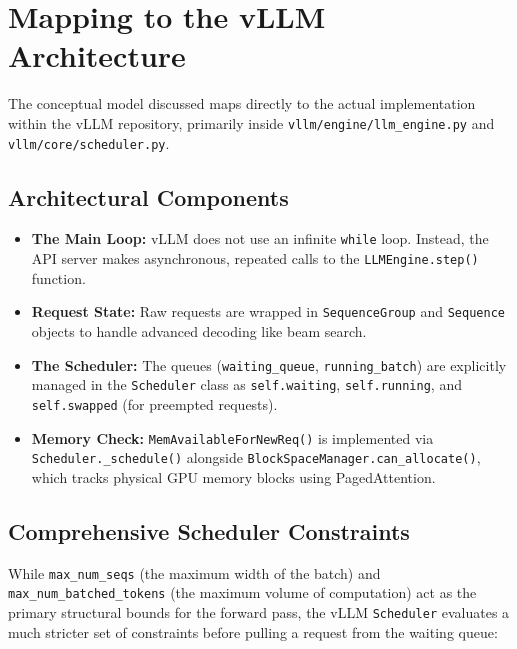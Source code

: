 \documentclass[11pt]{article}
\begin{document}
\section{Mapping to the vLLM Architecture}
\label{sec:vllm_mapping}

The conceptual model discussed maps directly to the actual implementation within the vLLM repository, primarily inside \texttt{vllm/engine/llm\_engine.py} and \texttt{vllm/core/scheduler.py}.

\subsection{Architectural Components}
\label{subsec:vllm_architecture}

\begin{itemize}
    \item \textbf{The Main Loop:} vLLM does not use an infinite \texttt{while} loop. Instead, the API server makes asynchronous, repeated calls to the \texttt{LLMEngine.step()} function.
    \item \textbf{Request State:} Raw requests are wrapped in \texttt{SequenceGroup} and \texttt{Sequence} objects to handle advanced decoding like beam search.
    \item \textbf{The Scheduler:} The queues (\texttt{waiting\_queue}, \texttt{running\_batch}) are explicitly managed in the \texttt{Scheduler} class as \texttt{self.waiting}, \texttt{self.running}, and \texttt{self.swapped} (for preempted requests).
    \item \textbf{Memory Check:} \texttt{MemAvailableForNewReq()} is implemented via \texttt{Scheduler.\_schedule()} alongside \texttt{BlockSpaceManager.can\_allocate()}, which tracks physical GPU memory blocks using PagedAttention.
\end{itemize}

\subsection{Comprehensive Scheduler Constraints}
\label{subsec:vllm_constraints}

While \texttt{max\_num\_seqs} (the maximum width of the batch) and \texttt{max\_num\_batched\_tokens} (the maximum volume of computation) act as the primary structural bounds for the forward pass, the vLLM \texttt{Scheduler} evaluates a much stricter set of constraints before pulling a request from the waiting queue:
\end{document}
